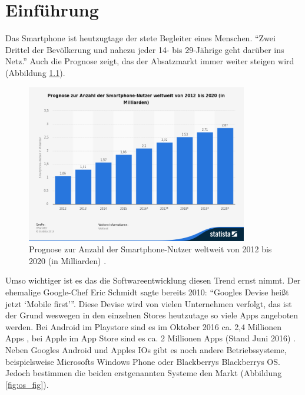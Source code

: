\chapter{Einführung}\label{ch:intro}

Das Smartphone ist heutzugtage der stete Begleiter eines Menschen. \enquote{Zwei Drittel der Bevölkerung und nahezu jeder 14- bis 29-Jährige geht darüber ins Netz.} \cite{usage} Auch die Prognose zeigt, das der Absatzmarkt immer weiter steigen wird (Abbildung \ref{fig:prognose_fig}).

\begin{figure}[H]
	\begin{center}
		\includegraphics[width=0.86\textwidth]{images/prognose-zur-anzahl-der-smartphone-nutzer-weltweit-bis-2020.png}
		\caption{Prognose zur Anzahl der Smartphone-Nutzer weltweit von 2012 bis 2020 (in Milliarden) \cite{prognose}.}
		\label{fig:prognose_fig}
	\end{center}
\end{figure}

Umso wichtiger ist es das die Softwareentwicklung diesen Trend ernst nimmt. Der ehemalige Google-Chef Eric Schmidt sagte bereits 2010: \enquote{Googles Devise heißt jetzt \enquote{Mobile first}}. 
Diese Devise wird von vielen Unternehmen verfolgt, das ist der Grund weswegen in den einzelnen Stores heutzutage so viele Apps angeboten werden. Bei Android im Playstore sind es im Oktober 2016 ca. 2,4 Millionen Apps \cite{play_store}, bei Apple im App Store sind es ca. 2 Millionen Apps (Stand Juni 2016) \cite{app_store}. Neben Googles Android und Apples IOs gibt es noch andere Betriebssysteme, beispielsweise Microsofts Windows Phone oder Blackberrys Blackberrys OS. Jedoch bestimmen die beiden erstgenannten Systeme den Markt (Abbildung \ref{fig:os_fig}).

